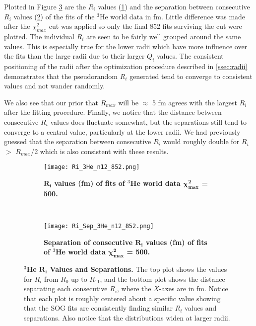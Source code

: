 Plotted in Figure \ref{fig:3he_ri} are the $R_i$ values (\ref{fig:3he_ri_ind}) and the separation between consecutive $R_i$ values (\ref{fig:3he_ri_sep}) of the fits of the $^3$He world data in fm. Little difference was made after the $\chi^2_{max}$ cut was applied so only the final 852 fits surviving the cut were plotted. The individual $R_i$ are seen to be fairly well grouped around the same values. This is especially true for the lower radii which have more influence over the fits than the large radii due to their larger $Q_i$ values. The consistent positioning of the radii after the optimization procedure described in \ref{ssec:radii} demonstrates that the pseudorandom $R_i$ generated tend to converge to consistent values and not wander randomly. 

We also see that our prior that $R_{max}$ will be $\approx$ 5 fm agrees with the largest $R_i$ after the fitting procedure. Finally, we notice that the distance between consecutive $R_i$ values does fluctuate somewhat, but the separations still tend to converge to a central value, particularly at the lower radii. We had previously guessed that the separation between consecutive $R_i$ would roughly double for $R_i$ $>$ $R_{max}$/2 which is also consistent with these results.

\begin{figure}[!ht]
\begin{subfigure}{1.\textwidth}
  \centering
  \texttt{[image: Ri\_3He\_n12\_852.png]}
  \caption{\bf{$\boldsymbol{R_i}$ values (fm) of fits of $^3$He world data $\boldsymbol{\chi^2_{max}}$ = 500.}}
  \label{fig:3he_ri_ind}
\end{subfigure}\\
\begin{subfigure}{1.\textwidth}
  \centering
  \texttt{[image: Ri\_Sep\_3He\_n12\_852.png]}
  \caption{\bf{Separation of consecutive $\boldsymbol{R_i}$ values (fm) of fits of $^3$He world data $\boldsymbol{\chi^2_{max}}$ = 500.}}
  \label{fig:3he_ri_sep}
\end{subfigure}
\caption[$^3$He $R_i$ Values and Separations]{{\bf{$^3$He $\boldsymbol{R_i}$ Values and Separations.}} The top plot shows the values for $R_i$ from $R_0$ up to $R_{11}$, and the bottom plot shows the distance separating each consecutive $R_i$, where the $X$-axes are in fm. Notice that each plot is roughly centered about a specific value showing that the SOG fits are consistently finding similar $R_i$ values and separations. Also notice that the distributions widen at larger radii.}
\label{fig:3he_ri}
\end{figure}

